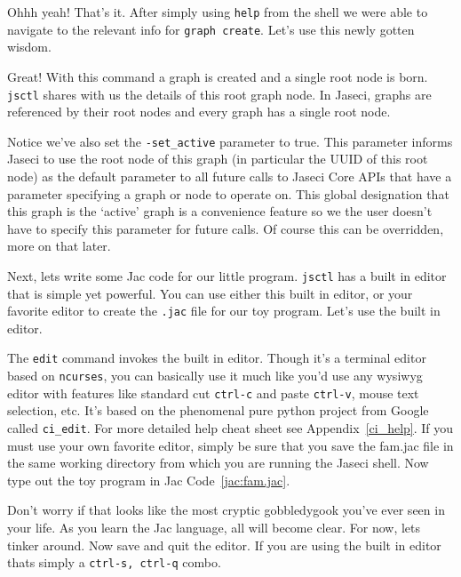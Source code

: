 \par
{}
\par
Ohhh yeah! That's it. After simply using \texttt{help} from the shell we were able to navigate to the relevant info for \texttt{graph create}. Let's use this newly gotten wisdom.
\par
{}
\par
Great! With this command a graph is created and a single root node is born. \texttt{jsctl} shares with us the details of this root graph node. In Jaseci, graphs are referenced by their root nodes and every graph has a single root node.
\par
Notice we've also set the \texttt{-set\_active} parameter to true. This parameter informs Jaseci to use the root node of this graph (in particular the UUID of this root node) as the default parameter to all future calls to Jaseci Core APIs that have a parameter specifying a graph or node to operate on. This global designation that this graph is the `active' graph is a convenience feature so we the user doesn't have to specify this parameter for future calls. Of course this can be overridden, more on that later.
\par
Next, lets write some Jac code for our little program. \texttt{jsctl} has a built in editor that is simple yet powerful. You can use either this built in editor, or your favorite editor to create the \texttt{.jac} file for our toy program. Let's use the built in editor.
\par
{}
\par
The \texttt{edit} command invokes the built in editor. Though it's a terminal editor based on \texttt{ncurses}, you can basically use it much like you'd use any wysiwyg editor with features like standard cut \texttt{ctrl-c} and paste \texttt{ctrl-v}, mouse text selection, etc. It's based on the phenomenal pure python project from Google called \texttt{ci\_edit}. For more detailed help cheat sheet see Appendix~\ref{ci_help}. If you must use your own favorite editor, simply be sure that you save the fam.jac file in the same working directory from which you are running the Jaseci shell. Now type out the toy program in Jac Code~\ref{jac:fam.jac}.
\par
{}
\par
Don't worry if that looks like the most cryptic \gls{gobbledygook} you've ever seen in your life. As you learn the Jac language, all will become clear. For now, lets tinker around. Now save and quit the editor. If you are using the built in editor thats simply a \texttt{ctrl-s, ctrl-q} combo.
